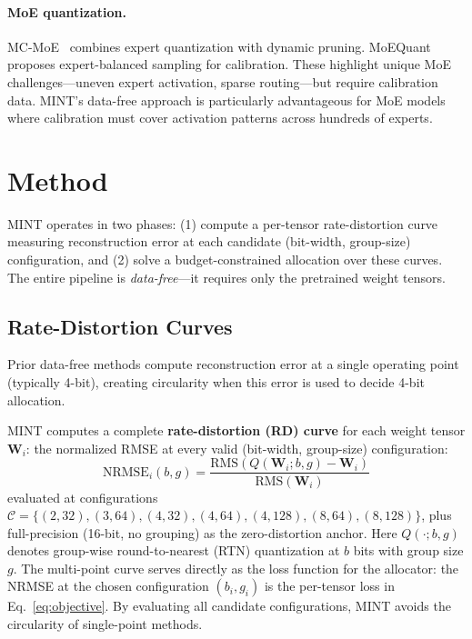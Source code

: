 \documentclass{article}
\begin{document}
\paragraph{MoE quantization.}
MC-MoE~\cite{wei2025mcmoe} combines expert quantization with dynamic pruning. MoEQuant~\cite{huang2025moequant} proposes expert-balanced sampling for calibration. These highlight unique MoE challenges---uneven expert activation, sparse routing---but require calibration data. MINT's data-free approach is particularly advantageous for MoE models where calibration must cover activation patterns across hundreds of experts.

\section{Method}
\label{sec:method}

MINT operates in two phases: (1) compute a per-tensor rate-distortion curve measuring reconstruction error at each candidate (bit-width, group-size) configuration, and (2) solve a budget-constrained allocation over these curves. The entire pipeline is \emph{data-free}---it requires only the pretrained weight tensors.

\subsection{Rate-Distortion Curves}

Prior data-free methods compute reconstruction error at a single operating point (typically 4-bit), creating circularity when this error is used to decide 4-bit allocation.

MINT computes a complete \textbf{rate-distortion (RD) curve} for each weight tensor $\mathbf{W}_i$: the normalized RMSE at every valid (bit-width, group-size) configuration:
\begin{equation}
    \text{NRMSE}_i(b, g) = \frac{\text{RMS}(Q(\mathbf{W}_i; b, g) - \mathbf{W}_i)}{\text{RMS}(\mathbf{W}_i)}
\end{equation}
evaluated at configurations $\mathcal{C} = \{(2,32), (3,64), (4,32), (4,64), (4,128), (8,64), (8,128)\}$, plus full-precision (16-bit, no grouping) as the zero-distortion anchor. Here $Q(\cdot; b, g)$ denotes group-wise round-to-nearest (RTN) quantization at $b$ bits with group size $g$. The multi-point curve serves directly as the loss function for the allocator: the NRMSE at the chosen configuration $(b_i, g_i)$ is the per-tensor loss in Eq.~\ref{eq:objective}. By evaluating all candidate configurations, MINT avoids the circularity of single-point methods.
\end{document}
